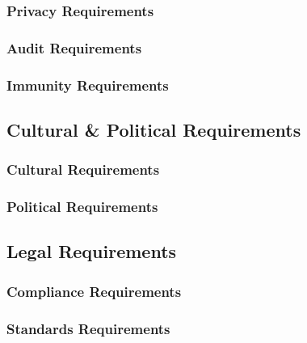 \documentclass[titlepage]{article}
\begin{document}
\subsubsection{Privacy Requirements}
\subsubsection{Audit Requirements}
\subsubsection{Immunity Requirements}

\subsection{Cultural \& Political Requirements}
\subsubsection{Cultural Requirements}
\subsubsection{Political Requirements}

\subsection{Legal Requirements}
\subsubsection{Compliance Requirements}
\subsubsection{Standards Requirements}
\end{document}
